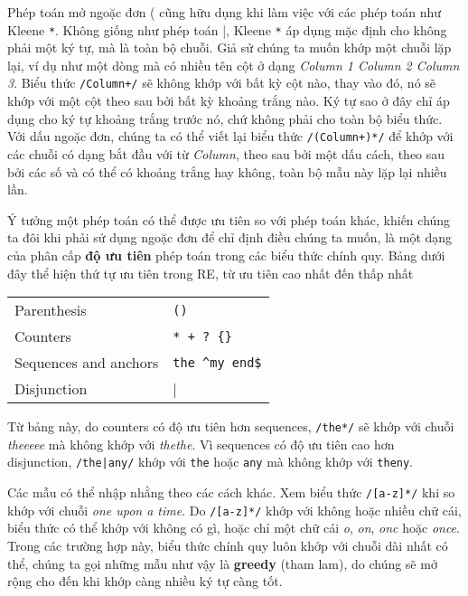 Phép toán mở ngoặc đơn ( cũng hữu dụng khi làm việc với các phép toán như Kleene \verb|*|. Không giống như phép toán |, Kleene \verb|*| áp dụng mặc định cho không phải một ký tự, mà là toàn bộ chuỗi. Giả sử chúng ta muốn khớp một chuỗi lặp lại, ví dụ như một dòng mà có nhiều tên cột ở dạng \textit{Column 1 \hspace{0.1em} Column 2 \hspace{0.1em} Column 3}. Biểu thức \texttt{/Column\textvisiblespace[0-9]+\textvisiblespace*/} sẽ không khớp với bất kỳ cột nào, thay vào đó, nó sẽ khớp với một cột theo sau bởi bất kỳ khoảng trắng nào. Ký tự sao ở đây chỉ áp dụng cho ký tự khoảng trắng trước nó, chứ không phải cho toàn bộ biểu thức. Với dấu ngoặc đơn, chúng ta có thể viết lại biểu thức \texttt{/(Column\textvisiblespace[0-9]+\textvisiblespace*)*/} để khớp với các chuỗi có dạng bắt đầu với từ \textit{Column}, theo sau bởi một dấu cách, theo sau bởi các số và có thể có khoảng trắng hay không, toàn bộ mẫu này lặp lại nhiều lần.

Ý tưởng một phép toán có thể được ưu tiên so với phép toán khác, khiến chúng ta đôi khi phải sử dụng ngoặc đơn để chỉ định điều chúng ta muốn, là một dạng của phân cấp \textbf{độ ưu tiên} phép toán trong các biểu thức chính quy. Bảng dưới đây thể hiện thứ tự ưu tiên trong RE, từ ưu tiên cao nhất đến thấp nhất

\begin{center}
\begin{tabular}{ l l }
	 Parenthesis & \verb|()| \\
	 Counters  & \verb|* + ? {}| \\
	 Sequences and anchors & \verb|the ^my end$| \\
	 Disjunction & \verb||| \\
\end{tabular}
\end{center}

Từ bảng này, do counters có độ ưu tiên hơn sequences, \verb|/the*/| sẽ khớp với chuỗi \textit{theeeee} mà không khớp với \textit{thethe}. Vì sequences có độ ưu tiên cao hơn disjunction, \texttt{/the|any/} khớp với \verb|the| hoặc \verb|any| mà không khớp với \verb|theny|.

Các mẫu có thể nhập nhằng theo các cách khác. Xem biểu thức \verb|/[a-z]*/| khi so khớp với chuỗi \textit{one upon a time}. Do \verb|/[a-z]*/| khớp với không hoặc nhiều chữ cái, biểu thức có thể khớp với không có gì, hoặc chỉ một chữ cái \textit{o}, \textit{on}, \textit{onc} hoặc \textit{once}. Trong các trường hợp này, biểu thức chính quy luôn khớp với chuỗi dài nhất có thể, chúng ta gọi những mẫu như vậy là \textbf{greedy} (tham lam), do chúng sẽ mở rộng cho đến khi khớp càng nhiều ký tự càng tốt.

